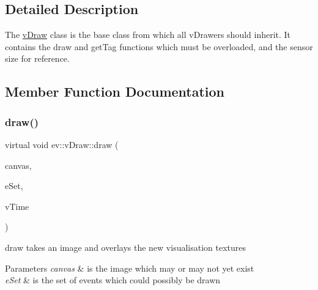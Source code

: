 \subsection{Detailed Description}
The \hyperlink{classev_1_1vDraw}{v\+Draw} class is the base class from which all v\+Drawers should inherit. It contains the draw and get\+Tag functions which must be overloaded, and the sensor size for reference. 

\subsection{Member Function Documentation}
\mbox{\label{classev_1_1vDraw_af1eee5dcdf3b4cfee6a3024e5cd706f8}} 
\subsubsection{\texorpdfstring{draw()}{draw()}}
{\footnotesize\ttfamily virtual void ev\+::v\+Draw\+::draw (\begin{DoxyParamCaption}\item[{cv\+::\+Mat \&}]{canvas,  }\item[{const ev\+::v\+Queue \&}]{e\+Set,  }\item[{int}]{v\+Time }\end{DoxyParamCaption})\hspace{0.3cm}{\ttfamily [pure virtual]}}



draw takes an image and overlays the new visualisation textures 


\begin{DoxyParams}{Parameters}
{\em canvas} & is the image which may or may not yet exist \\
\hline
{\em e\+Set} & is the set of events which could possibly be drawn \\
\hline
\end{DoxyParams}


